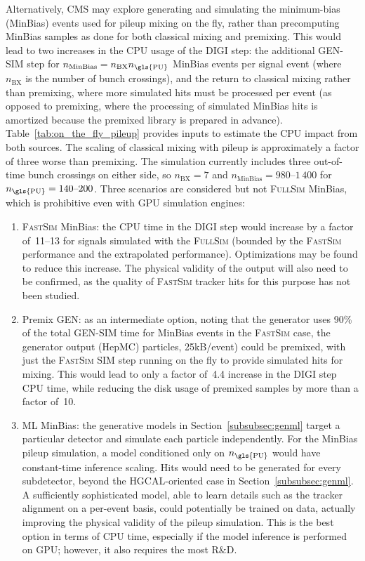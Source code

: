 Alternatively, CMS may explore generating and simulating the minimum-bias (MinBias) events used for pileup mixing on the fly, rather than precomputing MinBias samples as done for both classical mixing and premixing. This would lead to two increases in the \gls{CPU} usage of the \gls{DIGI} step: the additional \gls{GEN}-\gls{SIM} step for $n_{\text{MinBias}} = n_{\text{BX}}n_{\text{\gls{PU}}}$ MinBias events per signal event (where $n_{\text{BX}}$ is the number of bunch crossings), and the return to classical mixing rather than premixing, where more simulated hits must be processed per event (as opposed to premixing, where the processing of simulated MinBias hits is amortized because the premixed library is prepared in advance).
Table~\ref{tab:on_the_fly_pileup} provides inputs to estimate the \gls{CPU} impact from both sources.
The scaling of classical mixing with pileup is approximately a factor of three worse than premixing.
The \PhaseTwo simulation currently includes three out-of-time bunch crossings on either side, so $n_{\text{BX}} = 7$ and $n_{\text{MinBias}} = 980\text{--}1\,400$ for $n_{\text{\gls{PU}}} = 140\text{--}200$. Three scenarios are considered but not \textsc{FullSim} MinBias, which is prohibitive even with \gls{GPU} simulation engines:
\begin{enumerate}
\item \textsc{FastSim} MinBias: the \gls{CPU} time in the \gls{DIGI} step would increase by a factor of~11--13 for signals simulated with the \PhaseTwo \textsc{FullSim} (bounded by the \textsc{FastSim} \PhaseOne performance and the extrapolated \PhaseTwo performance). Optimizations may be found to reduce this increase. The physical validity of the output will also need to be confirmed, as the quality of \textsc{FastSim} tracker hits for this purpose has not been studied.
\item Premix \gls{GEN}: as an intermediate option, noting that the generator uses 90\% of the total \gls{GEN}-\gls{SIM} time for MinBias events in the \textsc{FastSim} case, the generator output (HepMC) particles, 25\unit{kB/event}) could be premixed, with just the \textsc{FastSim} \gls{SIM} step running on the fly to provide simulated hits for mixing. This would lead to only a factor of~4.4 increase in the \gls{DIGI} step \gls{CPU} time, while reducing the disk usage of premixed samples by more than a factor of~10.
\item \gls{ML} MinBias: the generative models in Section~\ref{subsubsec:genml} target a particular detector and simulate each particle independently. For the MinBias pileup simulation, a model conditioned only on $n_{\text{\gls{PU}}}$ would have constant-time inference scaling. Hits would need to be generated for every subdetector, beyond the \gls{HGCAL}-oriented case in Section~\ref{subsubsec:genml}. A sufficiently sophisticated model, able to learn details such as the tracker alignment on a per-event basis, could potentially be trained on data, actually improving the physical validity of the pileup simulation. This is the best option in terms of \gls{CPU} time, especially if the model inference is performed on \gls{GPU}; however, it also requires the most R\&D.
\end{enumerate}
